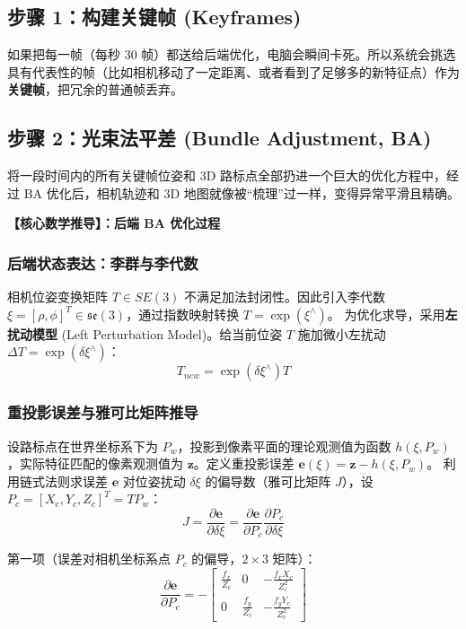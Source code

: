 \documentclass[12pt,a4paper]{article}
\begin{document}
\subsection{步骤 1：构建关键帧 (Keyframes)}
如果把每一帧（每秒 30 帧）都送给后端优化，电脑会瞬间卡死。所以系统会挑选具有代表性的帧（比如相机移动了一定距离、或者看到了足够多的新特征点）作为\textbf{关键帧}，把冗余的普通帧丢弃。

\subsection{步骤 2：光束法平差 (Bundle Adjustment, BA)}
将一段时间内的所有关键帧位姿和 3D 路标点全部扔进一个巨大的优化方程中，经过 BA 优化后，相机轨迹和 3D 地图就像被“梳理”过一样，变得异常平滑且精确。

\vspace{0.3cm}
\textbf{【核心数学推导】：后端 BA 优化过程}

\subsubsection{后端状态表达：李群与李代数}
相机位姿变换矩阵 $T \in SE(3)$ 不满足加法封闭性。因此引入李代数 $\xi = [\rho, \phi]^T \in \mathfrak{se}(3)$，通过指数映射转换 $T = \exp(\xi^{\wedge})$。
为优化求导，采用\textbf{左扰动模型} (Left Perturbation Model)。给当前位姿 $T$ 施加微小左扰动 $\Delta T = \exp(\delta \xi^{\wedge})$：
\begin{equation}
    T_{new} = \exp(\delta \xi^{\wedge}) T
\end{equation}

\subsubsection{重投影误差与雅可比矩阵推导}
设路标点在世界坐标系下为 $P_w$，投影到像素平面的理论观测值为函数 $h(\xi, P_w)$，实际特征匹配的像素观测值为 $\mathbf{z}$。定义重投影误差 $\mathbf{e}(\xi) = \mathbf{z} - h(\xi, P_w)$。
利用链式法则求误差 $\mathbf{e}$ 对位姿扰动 $\delta \xi$ 的偏导数（雅可比矩阵 $J$），设 $P_c = [X_c, Y_c, Z_c]^T = T P_w$：
\begin{equation}
    J = \frac{\partial \mathbf{e}}{\partial \delta \xi} = \frac{\partial \mathbf{e}}{\partial P_c} \frac{\partial P_c}{\partial \delta \xi}
\end{equation}

第一项（误差对相机坐标系点 $P_c$ 的偏导，$2 \times 3$ 矩阵）：
\begin{equation}
    \frac{\partial \mathbf{e}}{\partial P_c} = - 
    \begin{bmatrix} 
        \frac{f_x}{Z_c} & 0 & -\frac{f_x X_c}{Z_c^2} \\ 
        0 & \frac{f_y}{Z_c} & -\frac{f_y Y_c}{Z_c^2} 
    \end{bmatrix}
\end{equation}
\end{document}
